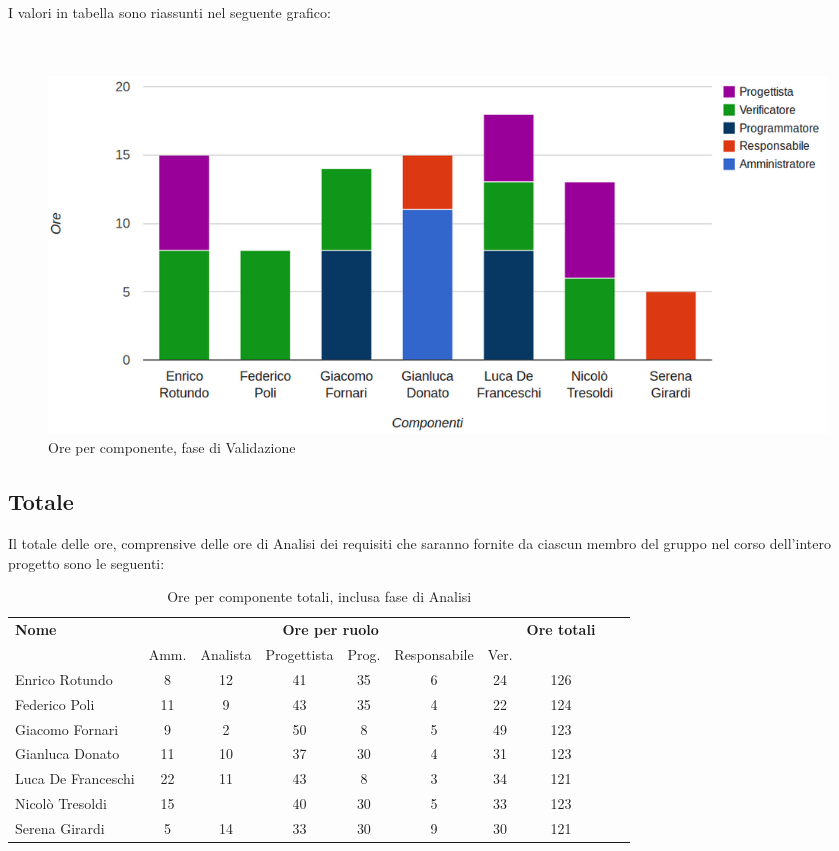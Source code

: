 I valori in tabella sono riassunti nel seguente grafico: \\ \\ \\

\begin{figure}[H]
\centering
\includegraphics[scale=0.35]{4-4.png}
\caption{Ore per componente, fase di Validazione\label{fig:nome}}
\end{figure}

\subsection{Totale}

Il totale delle ore, comprensive delle ore di Analisi dei requisiti che saranno fornite da ciascun membro del gruppo nel corso dell'intero progetto sono le seguenti:

\begin{table}[H]
\centering
\begin{tabular}{lccccccccc}
\toprule 
    \textbf{Nome}  & \multicolumn{6}{c}{\textbf{Ore per ruolo}} & \textbf{Ore totali}\\
    & Amm. & Analista & Progettista
    & Prog. & Responsabile & Ver. \\
    \midrule
    Enrico Rotundo   	& 8 & 12& 41 & 35 & 6 & 24 & 126 \\
    Federico Poli  		& 11	& 9 & 43 & 35 & 4 & 22 & 124 \\
    Giacomo Fornari		& 9	& 2 & 50 & 8  & 5 & 49 & 123 \\
    Gianluca Donato 		& 11	& 10& 37 & 30 & 4 & 31 & 123 \\
    Luca De Franceschi 	& 22	& 11& 43 & 8  & 3 & 34 & 121 \\
    Nicolò Tresoldi 		& 15	&   & 40 & 30 & 5 & 33 & 123 \\
    Serena Girardi 		& 5	& 14& 33 & 30 & 9 & 30 & 121 \\
    
    \bottomrule
\end{tabular}
\caption{Ore per componente totali, inclusa fase di Analisi}
\end{table}

